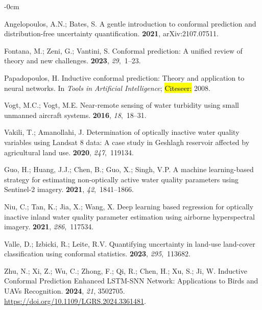 \documentclass[remotesensing,article,accept,pdftex,moreauthors]{Definitions/mdpi}
\begin{document}
\begin{adjustwidth}{-\extralength}{0cm}
\begin{thebibliography}{999}
Angelopoulos, A.N.; Bates, S.
\newblock A gentle introduction to conformal prediction and distribution-free
  uncertainty quantification.
 {\bf 2021},  arXiv:2107.07511.

Fontana, M.; Zeni, G.; Vantini, S.
\newblock Conformal prediction: A unified review of theory and new challenges.
 {\bf 2023}, {\em 29},~1--23.

Papadopoulos, H.
\newblock Inductive conformal prediction: Theory and application to neural
  networks. In {\em Tools in Artificial Intelligence}; \hl{Citeseer:} %
 2008.

Vogt, M.C.; Vogt, M.E.
\newblock Near-remote sensing of water turbidity using small unmanned aircraft
  systems.
 {\bf 2016}, {\em 18},~18--31.

Vakili, T.; Amanollahi, J.
\newblock Determination of optically inactive water quality variables using
  Landsat 8 data: A case study in Geshlagh reservoir affected by agricultural
  land use.
 {\bf 2020}, {\em 247},~119134.

Guo, H.; Huang, J.J.; Chen, B.; Guo, X.; Singh, V.P.
\newblock A machine learning-based strategy for estimating non-optically active
  water quality parameters using Sentinel-2 imagery.
 {\bf 2021}, {\em
  42},~1841--1866.

Niu, C.; Tan, K.; Jia, X.; Wang, X.
\newblock Deep learning based regression for optically inactive inland water
  quality parameter estimation using airborne hyperspectral imagery.
 {\bf 2021}, {\em 286},~117534.

Valle, D.; Izbicki, R.; Leite, R.V.
\newblock Quantifying uncertainty in land-use land-cover classification using
  conformal statistics.
 {\bf 2023}, {\em 295},~113682.

Zhu, N.; Xi, Z.; Wu, C.; Zhong, F.; Qi, R.; Chen, H.; Xu, S.; Ji, W.
\newblock Inductive Conformal Prediction Enhanced LSTM-SNN Network:
  Applications to Birds and UAVs Recognition.
 {\bf 2024}, \emph{21}, 3502705. \url{https://doi.org/10.1109/LGRS.2024.3361481}.


\end{thebibliography}
\end{adjustwidth}
\end{document}
